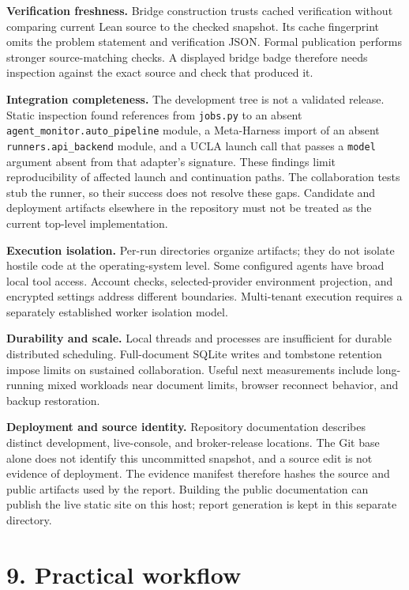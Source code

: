 \documentclass[11pt,a4paper]{article}
\begin{document}
\textbf{Verification freshness.} Bridge construction trusts cached verification without comparing current Lean source to the checked snapshot. Its cache fingerprint omits the problem statement and verification JSON. Formal publication performs stronger source-matching checks. A displayed bridge badge therefore needs inspection against the exact source and check that produced it.

\textbf{Integration completeness.} The development tree is not a validated release. Static inspection found references from \nolinkurl{jobs.py} to an absent \nolinkurl{agent_monitor.auto_pipeline} module, a Meta-Harness import of an absent \nolinkurl{runners.api_backend} module, and a UCLA launch call that passes a \nolinkurl{model} argument absent from that adapter's signature. These findings limit reproducibility of affected launch and continuation paths. The collaboration tests stub the runner, so their success does not resolve these gaps. Candidate and deployment artifacts elsewhere in the repository must not be treated as the current top-level implementation.

\textbf{Execution isolation.} Per-run directories organize artifacts; they do not isolate hostile code at the operating-system level. Some configured agents have broad local tool access. Account checks, selected-provider environment projection, and encrypted settings address different boundaries. Multi-tenant execution requires a separately established worker isolation model.

\textbf{Durability and scale.} Local threads and processes are insufficient for durable distributed scheduling. Full-document SQLite writes and tombstone retention impose limits on sustained collaboration. Useful next measurements include long-running mixed workloads near document limits, browser reconnect behavior, and backup restoration.

\textbf{Deployment and source identity.} Repository documentation describes distinct development, live-console, and broker-release locations. The Git base alone does not identify this uncommitted snapshot, and a source edit is not evidence of deployment. The evidence manifest therefore hashes the source and public artifacts used by the report. Building the public documentation can publish the live static site on this host; report generation is kept in this separate directory.

\section*{9. Practical workflow}
\end{document}
